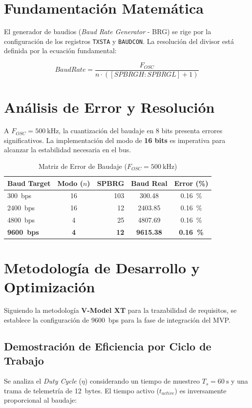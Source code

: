 \documentclass[11pt,a4paper]{article}
\begin{document}
\section{Fundamentación Matemática}
El generador de baudios (\textit{Baud Rate Generator} - BRG) se rige por la configuración de los registros \texttt{TXSTA} y \texttt{BAUDCON}. La resolución del divisor está definida por la ecuación fundamental:

\begin{equation}
BaudRate = \frac{F_{OSC}}{n \cdot ([SPBRGH:SPBRGL] + 1)}
\end{equation}

\section{Análisis de Error y Resolución}
A $F_{OSC} = \SI{500}{\kilo\hertz}$, la cuantización del baudaje en 8 bits presenta errores significativos. La implementación del modo de \textbf{16 bits} es imperativa para alcanzar la estabilidad necesaria en el bus.

\begin{table}[h]
\centering
\renewcommand{\arraystretch}{1.2}
\caption{Matriz de Error de Baudaje ($F_{OSC} = \SI{500}{\kilo\hertz}$)}
\vspace{3mm}
\begin{tabular}{lcrcc}
\toprule
\textbf{Baud Target} & \textbf{Modo ($n$)} & \textbf{SPBRG} & \textbf{Baud Real} & \textbf{Error (\%)} \\ 
\midrule
\SI{300}{bps}  & 16 & 103 & 300.48 & \SI{0.16}{\percent} \\
\SI{2400}{bps} & 16 & 12  & 2403.85 & \SI{0.16}{\percent} \\
\SI{4800}{bps} & 4  & 25  & 4807.69 & \SI{0.16}{\percent} \\
\textbf{\SI{9600}{bps}} & \textbf{4} & \textbf{12} & \textbf{9615.38} & \textbf{\SI{0.16}{\percent}} \\
\bottomrule
\end{tabular}
\end{table}

\section{Metodología de Desarrollo y Optimización}
Siguiendo la metodología \textbf{V-Model XT} para la trazabilidad de requisitos, se establece la configuración de \SI{9600}{bps} para la fase de integración del MVP.

\subsection{Demostración de Eficiencia por Ciclo de Trabajo}
Se analiza el \textit{Duty Cycle} ($\eta$) considerando un tiempo de muestreo $T_s = \SI{60}{\second}$ y una trama de telemetría de \SI{12}{bytes}. El tiempo activo ($t_{active}$) es inversamente proporcional al baudaje:
\end{document}

